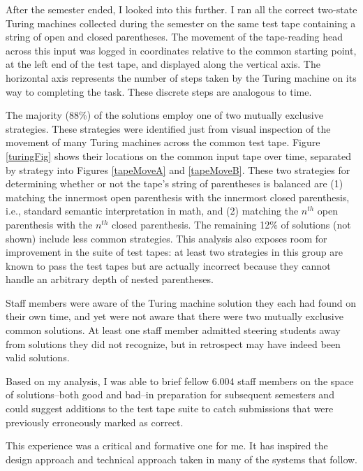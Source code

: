 After the semester ended, I looked into this further. I ran all the correct two-state Turing machines collected during the semester on the same test tape containing a string of open and closed parentheses. The movement of the tape-reading head across this input was logged in coordinates relative to the common starting point, at the left end of the test tape, and displayed along the vertical axis. The horizontal axis represents the number of steps taken by the Turing machine on its way to completing the task. These discrete steps are analogous to time. 

The majority (88\%) of the solutions employ one of two mutually exclusive strategies. These strategies were identified just from visual inspection of the movement of many Turing machines across the common test tape. Figure \ref{turingFig} shows their locations on the common input tape over time, separated by strategy into Figures \ref{tapeMoveA} and \ref{tapeMoveB}. These two strategies for determining whether or not the tape's string of parentheses is balanced are (1) matching the innermost open parenthesis with the innermost closed parenthesis, i.e., standard semantic interpretation in math, and (2) matching the $n^{th}$  open parenthesis with the $n^{th}$ closed parenthesis. The remaining 12\% of solutions (not shown) include less common strategies. This analysis also exposes room for improvement in the suite of test tapes: at least two strategies in this group are known to pass the test tapes but are actually incorrect because they cannot handle an arbitrary depth of nested parentheses. 

Staff members were aware of the Turing machine solution they each had found on their own time, and yet were not aware that there were two mutually exclusive common solutions. At least one staff member admitted steering students away from solutions they did not recognize, but in retrospect may have indeed been valid solutions. 

Based on my analysis, I was able to brief fellow 6.004 staff members on the space of solutions--both good and bad--in preparation for subsequent semesters and could suggest additions to the test tape suite to catch submissions that were previously erroneously marked as correct. 

This experience was a critical and formative one for me. It has inspired the design approach and technical approach taken in many of the systems that follow.

